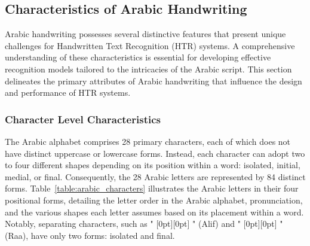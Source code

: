\documentclass[conference]{IEEEtran}
\newcommand{\artext}[1]{%
  {\fontsize{8pt}{11pt}\selectfont \raisebox{0pt}[0pt][0pt]{\RL{#1}}}%
}
\begin{document}
\subsection{Characteristics of Arabic Handwriting}

Arabic handwriting possesses several distinctive features that present unique challenges for Handwritten Text Recognition (HTR) systems. A comprehensive understanding of these characteristics is essential for developing effective recognition models tailored to the intricacies of the Arabic script. This section delineates the primary attributes of Arabic handwriting that influence the design and performance of HTR systems.

\subsubsection{Character Level Characteristics}

The Arabic alphabet comprises 28 primary characters, each of which does not have distinct uppercase or lowercase forms. Instead, each character can adopt two to four different shapes depending on its position within a word: isolated, initial, medial, or final. Consequently, the 28 Arabic letters are represented by 84 distinct forms. Table~\ref{table:arabic_characters} illustrates the Arabic letters in their four positional forms, detailing the letter order in the Arabic alphabet, pronunciation, and the various shapes each letter assumes based on its placement within a word. Notably, separating characters, such as "\artext{ا}" (Alif) and "\artext{ر}" (Raa), have only two forms: isolated and final.
\end{document}
